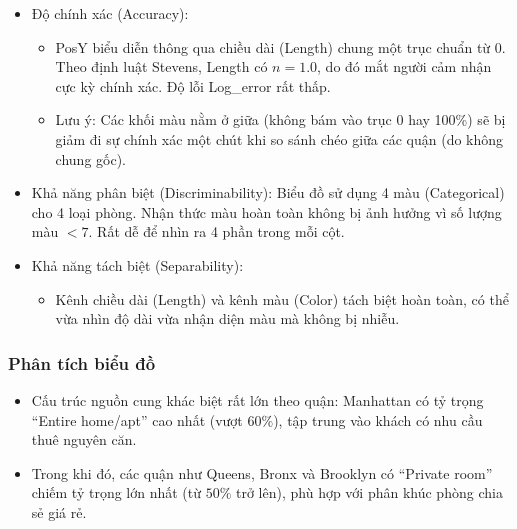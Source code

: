 \begin{itemize}
    \item Độ chính xác (Accuracy):
    \begin{itemize}
        \item PosY biểu diễn thông qua chiều dài (Length) chung một trục chuẩn từ 0. Theo định luật Stevens, Length có $n = 1.0$, do đó mắt người cảm nhận cực kỳ chính xác. Độ lỗi Log\_error rất thấp.
        \item Lưu ý: Các khối màu nằm ở giữa (không bám vào trục 0 hay 100\%) sẽ bị giảm đi sự chính xác một chút khi so sánh chéo giữa các quận (do không chung gốc).
    \end{itemize}
    \item Khả năng phân biệt (Discriminability): Biểu đồ sử dụng 4 màu (Categorical) cho 4 loại phòng. Nhận thức màu hoàn toàn không bị ảnh hưởng vì số lượng màu $< 7$. Rất dễ để nhìn ra 4 phần trong mỗi cột.
    \item Khả năng tách biệt (Separability):
    \begin{itemize}
        \item Kênh chiều dài (Length) và kênh màu (Color) tách biệt hoàn toàn, có thể vừa nhìn độ dài vừa nhận diện màu mà không bị nhiễu.
    \end{itemize}
\end{itemize}

\subsubsection{Phân tích biểu đồ}

\begin{itemize}
    \item Cấu trúc nguồn cung khác biệt rất lớn theo quận: Manhattan có tỷ trọng ``Entire home/apt'' cao nhất (vượt $60\%$), tập trung vào khách có nhu cầu thuê nguyên căn.
    \item Trong khi đó, các quận như Queens, Bronx và Brooklyn có ``Private room'' chiếm tỷ trọng lớn nhất (từ $50\%$ trở lên), phù hợp với phân khúc phòng chia sẻ giá rẻ.
\end{itemize}
